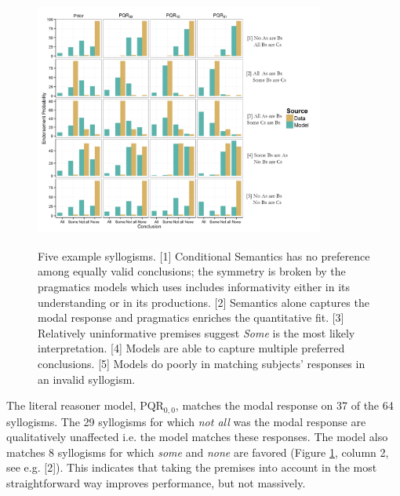 \documentclass[10pt,letterpaper]{article}
\begin{document}
\begin{figure}
\centering
    \includegraphics[width=0.85\textwidth,height=8.5cm]{fig1_multibar_alpha2_br25_n6_diverge_wtitles}
    \caption{Five example syllogisms. 
    [1] Conditional Semantics has no preference among equally valid conclusions; the symmetry is broken by the pragmatics models which uses includes informativity either in its understanding or in its productions.     
    [2] Semantics alone captures the modal response and pragmatics enriches the quantitative fit.     
    [3] Relatively uninformative premises suggest \emph{Some} is the most likely interpretation. 
    [4] Models are able to capture multiple preferred conclusions. 
    [5] Models do poorly in matching subjects' responses in an invalid syllogism.}
  \label{fig:barplots}
\end{figure}


The literal reasoner model, PQR$_{0,0}$, matches the modal response on 37 of the 64 syllogisms. The 29 syllogisms for which \emph{not all} was the modal response are qualitatively unaffected i.e. the model matches these responses. The model also matches 8 syllogisms for which \emph{some} and \emph{none} are favored (Figure \ref{fig:barplots}, column 2, see e.g. [2]). This indicates that taking the premises into account in the most straightforward way improves performance, but not massively.
%
\end{document}
